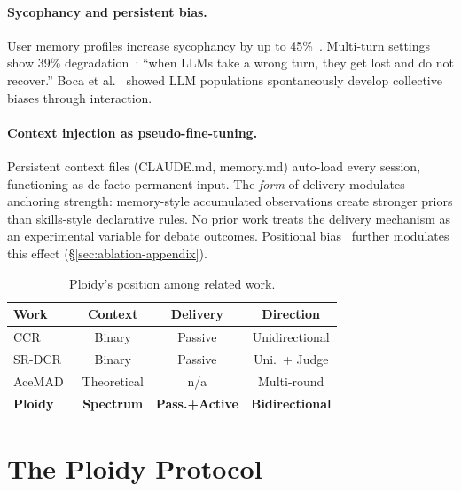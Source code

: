 \documentclass{article}
\begin{document}
\paragraph{Sycophancy and persistent bias.} User memory profiles increase sycophancy by up to 45\%~\citep{jain2025sycophancy}. Multi-turn settings show 39\% degradation~\citep{laban2025lost}: ``when LLMs take a wrong turn, they get lost and do not recover.'' Boca et al.~\citep{boca2025emergent} showed LLM populations spontaneously develop collective biases through interaction.

\paragraph{Context injection as pseudo-fine-tuning.} Persistent context files (CLAUDE.md, memory.md) auto-load every session, functioning as de facto permanent input. The \emph{form} of delivery modulates anchoring strength: memory-style accumulated observations create stronger priors than skills-style declarative rules. No prior work treats the delivery mechanism as an experimental variable for debate outcomes. Positional bias~\citep{liu2023lost} further modulates this effect (\S\ref{sec:ablation-appendix}).

\begin{table}[t]
\centering
\caption{Ploidy's position among related work.}
\label{tab:prior-work}
\footnotesize
\setlength{\tabcolsep}{3pt}
\begin{tabular}{@{}lccc@{}}
\toprule
\textbf{Work} & \textbf{Context} & \textbf{Delivery} & \textbf{Direction} \\
\midrule
CCR~\citep{song2026ccr} & Binary & Passive & Unidirectional \\
SR-DCR~\citep{srdcr2025} & Binary & Passive & Uni.\ + Judge \\
AceMAD~\citep{liu2026acemad} & Theoretical & n/a & Multi-round \\
\textbf{Ploidy} & \textbf{Spectrum} & \textbf{Pass.+Active} & \textbf{Bidirectional} \\
\bottomrule
\end{tabular}
\end{table}

\section{The Ploidy Protocol}
\label{sec:protocol}
\end{document}

